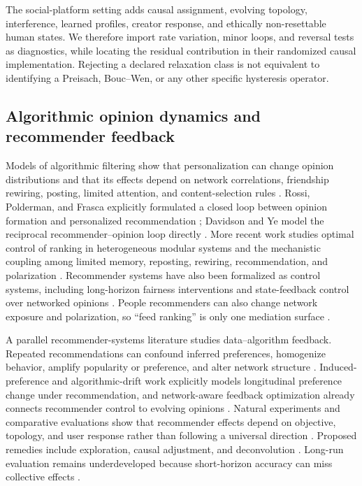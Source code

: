 \documentclass[10pt,a4paper]{article}
\begin{document}
The social-platform setting adds causal assignment, evolving topology, interference, learned profiles, creator response, and ethically non-resettable human states. We therefore import rate variation, minor loops, and reversal tests as diagnostics, while locating the residual contribution in their randomized causal implementation. Rejecting a declared relaxation class is not equivalent to identifying a Preisach, Bouc--Wen, or any other specific hysteresis operator.

\subsection{Algorithmic opinion dynamics and recommender feedback}

Models of algorithmic filtering show that personalization can change opinion distributions and that its effects depend on network correlations, friendship rewiring, posting, limited attention, and content-selection rules \cite{perra2019personalisation,sirbu2019bias,arruda2022algorithms,peralta2020asymmetry,valensise2023drivers,donkers2024desounding}. Rossi, Polderman, and Frasca explicitly formulated a closed loop between opinion formation and personalized recommendation \cite{rossi2018closedloop}; Davidson and Ye model the reciprocal recommender--opinion loop directly \cite{davidson2026closedloop}. More recent work studies optimal control of ranking in heterogeneous modular systems and the mechanistic coupling among limited memory, reposting, rewiring, recommendation, and polarization \cite{gezha2026control,oliveira2026interplay}. Recommender systems have also been formalized as control systems, including long-horizon fairness interventions and state-feedback control over networked opinions \cite{depasquale2026control,mariano2026optimal,mariano2026pathological}. People recommenders can also change network exposure and polarization, so ``feed ranking'' is only one mediation surface \cite{cinus2022people}.

A parallel recommender-systems literature studies data--algorithm feedback. Repeated recommendations can confound inferred preferences, homogenize behavior, amplify popularity or preference, and alter network structure \cite{chaney2018confounding,mansoury2020feedback,kalimeris2021amplification,zhao2013longterm,su2016network}. Induced-preference and algorithmic-drift work explicitly models longitudinal preference change under recommendation, and network-aware feedback optimization already connects recommender control to evolving opinions \cite{coppolillo2025drift,chandrasekaran2026networkaware}. Natural experiments and comparative evaluations show that recommender effects depend on objective, topology, and user response rather than following a universal direction \cite{moller2018diversity,fabbri2022minorities,frey2010connections}. Proposed remedies include exploration, causal adjustment, and deconvolution \cite{jadidinejad2020exploration,krauth2025causal,sinha2016deconvolving}. Long-run evaluation remains underdeveloped because short-horizon accuracy can miss collective effects \cite{jannach2020mcnamara,ge2020ecommerce,zoralioglu2026dynamic}.
\end{document}
